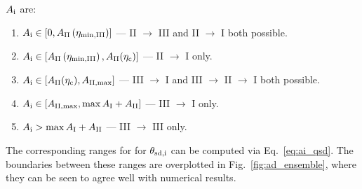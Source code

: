 \documentclass[
        fleqn,
        usenatbib,
        referee,
    ]{mnras}
\newcommand*{\p}[1]{\left(#1\right)}
\newcommand*{\s}[1]{\left[#1\right]}
\begin{document}
$A_{\rm i}$
are:
\begin{enumerate}
    \item $A_{\rm i} \in \s{0, A_{\rm II}\p{\eta_{\rm \min, III}}}$ --- II $\to$
        III and II $\to$ I both possible.

    \item $A_{\rm i} \in \s{A_{\rm II}\p{\eta_{\rm \min, III}}, A_{\rm
        II}(\eta_{\rm c})}$ --- II $\to$ I only.

    \item $A_{\rm i} \in \s{A_{\rm II}(\eta_{\rm c}), A_{\rm II, \max}}$ ---
        III $\to$ I and III $\to$ II $\to$ I both possible.

    \item $A_{\rm i} \in \s{A_{\rm II, \max}, \max A_{\rm I} + A_{\rm II}}$ ---
        III $\to$ I only.

    \item $A_{\rm i} > \max A_{\rm I} + A_{\rm II}$ --- III $\to$ III only.
\end{enumerate}
The corresponding ranges for for $\theta_{\rm sd,i}$ can be computed via
Eq.~\eqref{eq:ai_qsd}. The boundaries between these ranges are overplotted in
Fig.~\ref{fig:ad_ensemble}, where they can be seen to agree well with numerical
results.
\end{document}
